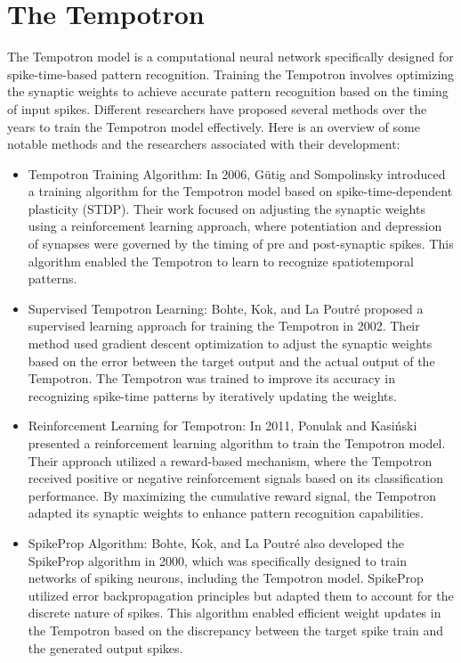 \section{The Tempotron}

The Tempotron model is a computational neural network specifically designed for spike-time-based pattern recognition. Training the Tempotron involves optimizing the synaptic weights to achieve accurate pattern recognition based on the timing of input spikes. Different researchers have proposed several methods over the years to train the Tempotron model effectively. Here is an overview of some notable methods and the researchers associated with their development:
\begin{itemize}

    \item Tempotron Training Algorithm: In 2006, Gütig and Sompolinsky \cite{gutig2006tempotron} introduced a training algorithm for the Tempotron model based on spike-time-dependent plasticity (STDP). Their work focused on adjusting the synaptic weights using a reinforcement learning approach, where potentiation and depression of synapses were governed by the timing of pre and post-synaptic spikes. This algorithm enabled the Tempotron to learn to recognize spatiotemporal patterns.
    
    \item 	Supervised Tempotron Learning: Bohte, Kok, and La Poutré \cite{bohte2002error} proposed a supervised learning approach for training the Tempotron in 2002. Their method used gradient descent optimization to adjust the synaptic weights based on the error between the target output and the actual output of the Tempotron. The Tempotron was trained to improve its accuracy in recognizing spike-time patterns by iteratively updating the weights.
    
    \item Reinforcement Learning for Tempotron: In 2011, Ponulak and Kasiński \cite{ponulak2011introduction} presented a reinforcement learning algorithm to train the Tempotron model. Their approach utilized a reward-based mechanism, where the Tempotron received positive or negative reinforcement signals based on its classification performance. By maximizing the cumulative reward signal, the Tempotron adapted its synaptic weights to enhance pattern recognition capabilities.
    
    \item SpikeProp Algorithm: Bohte, Kok, and La Poutré \cite{bohte2002error} also developed the SpikeProp algorithm in 2000, which was specifically designed to train networks of spiking neurons, including the Tempotron model. SpikeProp utilized error backpropagation principles but adapted them to account for the discrete nature of spikes. This algorithm enabled efficient weight updates in the Tempotron based on the discrepancy between the target spike train and the generated output spikes.
    

\end{itemize}
